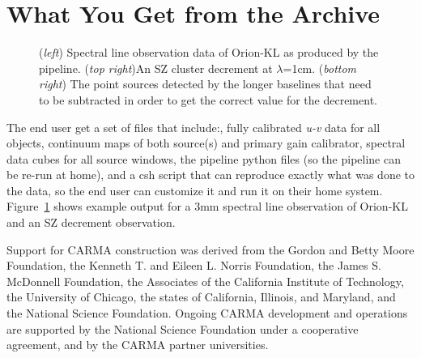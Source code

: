 \section{What You Get from the Archive}
\begin{figure}[!ht]
\end{figure}
\begin{figure}[!ht]
\caption{(\textit{left}) Spectral line observation data of Orion-KL as produced by the pipeline. (\textit{top right})An SZ cluster decrement at $\lambda$=1cm. (\textit{bottom right}) The point sources detected by the longer baselines that need to be subtracted in order to get the correct value for the decrement.\label{fig:SZD}}
\end{figure}
\begin{figure}[!ht]
\end{figure}
The end user get a set of files that include:, fully calibrated \textit{u-v} data for all objects, continuum maps of both source(s) and primary gain calibrator, spectral data cubes for all source windows, the pipeline python files (so the pipeline can be re-run at home), and a csh script that can reproduce exactly what was done to the data, so the end user can customize it and run it on their home system. Figure~\ref{fig:SZD} shows example output for a 3mm spectral line observation of Orion-KL and an SZ decrement observation.

\acknowledgements Support for CARMA construction was derived from the Gordon and Betty Moore Foundation, the Kenneth T. and Eileen L. Norris Foundation, the James S. McDonnell Foundation, the Associates of the California Institute of Technology, the University of Chicago, the states of California, Illinois, and Maryland, and the National Science Foundation. Ongoing CARMA development and operations are supported by the National Science Foundation under a cooperative agreement, and by the CARMA partner universities.


